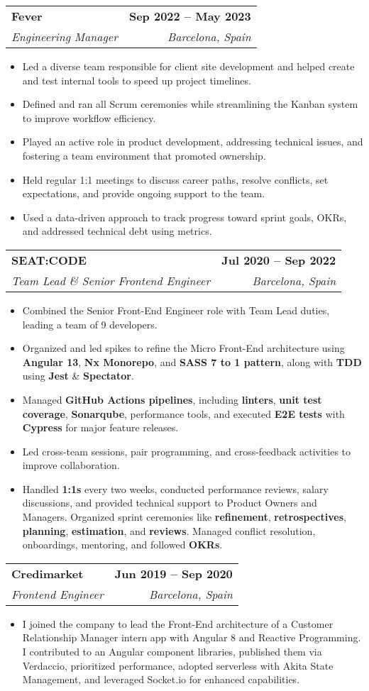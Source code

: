 \documentclass[letterpaper,11pt]{article}
\makeatletter
\newcommand{\resumeItem}[1]{
  \item\small{
    {#1 \vspace{-2pt}}
  }
}
\newcommand{\resumeSubheading}[4]{
  \vspace{-2pt}\item
    \begin{tabular*}{1.0\textwidth}[t]{l@{\extracolsep{\fill}}r}
      \textbf{#1} & \textbf{\small #2} \\
      \textit{\small#3} & \textit{\small #4} \\
    \end{tabular*}\vspace{-7pt}
}
\newcommand{\resumeItemListStart}{\begin{itemize}}
\newcommand{\resumeItemListEnd}{\end{itemize}\vspace{-5pt}}
\makeatother
\begin{document}
    \resumeSubheading
      {Fever}{Sep 2022 -- May 2023}
      {Engineering Manager}{Barcelona, Spain}
      \resumeItemListStart
        \resumeItem{Led a diverse team responsible for client site development and helped create and test internal tools to speed up project timelines.}
        \resumeItem{Defined and ran all Scrum ceremonies while streamlining the Kanban system to improve workflow efficiency.}
        \resumeItem{Played an active role in product development, addressing technical issues, and fostering a team environment that promoted ownership.}
        \resumeItem{Held regular 1:1 meetings to discuss career paths, resolve conflicts, set expectations, and provide ongoing support to the team.}
        \resumeItem{Used a data-driven approach to track progress toward sprint goals, OKRs, and addressed technical debt using metrics.}
      \resumeItemListEnd
    \vspace{8pt}


    \resumeSubheading
      {SEAT:CODE}{Jul 2020 -- Sep 2022}
      {Team Lead \& Senior Frontend Engineer}{Barcelona, Spain}
      \resumeItemListStart
        \resumeItem{Combined the Senior Front-End Engineer role with Team Lead duties, leading a team of 9 developers.}
        \resumeItem{Organized and led spikes to refine the Micro Front-End architecture using \textbf{Angular 13}, \textbf{Nx Monorepo}, and \textbf{SASS 7 to 1 pattern}, along with \textbf{TDD} using \textbf{Jest} \& \textbf{Spectator}.}
        \resumeItem{Managed \textbf{GitHub Actions pipelines}, including \textbf{linters}, \textbf{unit test coverage}, \textbf{Sonarqube}, performance tools, and executed \textbf{E2E tests} with \textbf{Cypress} for major feature releases.}
        \resumeItem{Led cross-team sessions, pair programming, and cross-feedback activities to improve collaboration.}
        \resumeItem{Handled \textbf{1:1s} every two weeks, conducted performance reviews, salary discussions, and provided technical support to Product Owners and Managers. Organized sprint ceremonies like \textbf{refinement}, \textbf{retrospectives}, \textbf{planning}, \textbf{estimation}, and \textbf{reviews}. Managed conflict resolution, onboardings, mentoring, and followed \textbf{OKRs}.}
      \resumeItemListEnd
    \vspace{8pt}

    \resumeSubheading
      {Credimarket}{Jun 2019 -- Sep 2020}
      {Frontend Engineer}{Barcelona, Spain}
      \resumeItemListStart
        \resumeItem{I joined the company to lead the Front-End architecture of a Customer Relationship Manager intern app with Angular 8 and Reactive Programming. I contributed to an Angular component libraries, published them via Verdaccio, prioritized performance, adopted serverless with Akita State Management, and leveraged Socket.io for enhanced capabilities.}
      \resumeItemListEnd  
    \vspace{18pt}
\end{document}
